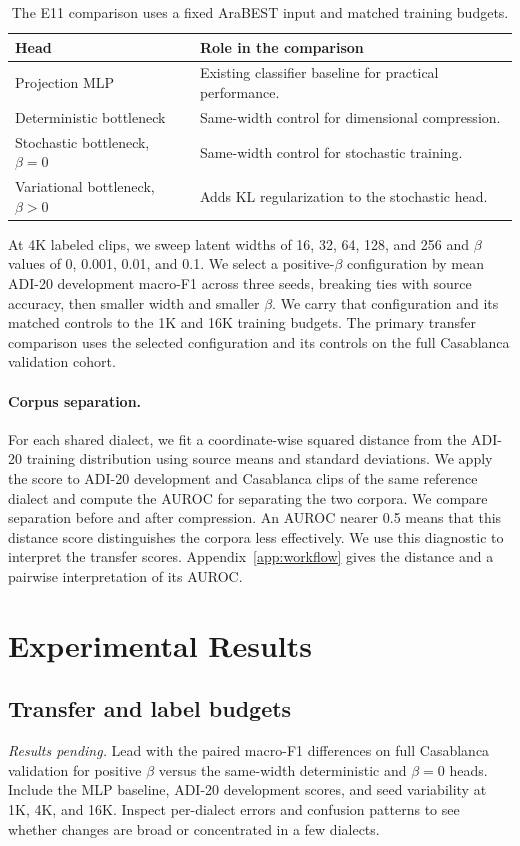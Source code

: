 \documentclass[11pt]{article}
\begin{document}
\begin{table}[tbp]
\centering
\small
\begin{tabularx}{\linewidth}{@{}lX@{}}
\toprule
Head & Role in the comparison \\
\midrule
Projection MLP & Existing classifier baseline for practical performance. \\
Deterministic bottleneck & Same-width control for dimensional compression. \\
Stochastic bottleneck, \(\beta=0\) & Same-width control for stochastic training. \\
Variational bottleneck, \(\beta>0\) & Adds KL regularization to the stochastic head. \\
\bottomrule
\end{tabularx}
\caption{The E11 comparison uses a fixed AraBEST input and matched training budgets.}
\end{table}

At 4K labeled clips, we sweep latent widths of 16, 32, 64, 128, and 256 and \(\beta\) values of 0, 0.001, 0.01, and 0.1. We select a positive-\(\beta\) configuration by mean ADI-20 development macro-F1 across three seeds, breaking ties with source accuracy, then smaller width and smaller \(\beta\). We carry that configuration and its matched controls to the 1K and 16K training budgets. The primary transfer comparison uses the selected configuration and its controls on the full Casablanca validation cohort.

\paragraph{Corpus separation.}
For each shared dialect, we fit a coordinate-wise squared distance from the ADI-20 training distribution using source means and standard deviations. We apply the score to ADI-20 development and Casablanca clips of the same reference dialect and compute the AUROC for separating the two corpora. We compare separation before and after compression. An AUROC nearer 0.5 means that this distance score distinguishes the corpora less effectively. We use this diagnostic to interpret the transfer scores. Appendix~\ref{app:workflow} gives the distance and a pairwise interpretation of its AUROC.

\section{Experimental Results}
\subsection{Transfer and label budgets}
\emph{Results pending.} Lead with the paired macro-F1 differences on full Casablanca validation for positive \(\beta\) versus the same-width deterministic and \(\beta=0\) heads. Include the MLP baseline, ADI-20 development scores, and seed variability at 1K, 4K, and 16K. Inspect per-dialect errors and confusion patterns to see whether changes are broad or concentrated in a few dialects.
\end{document}

